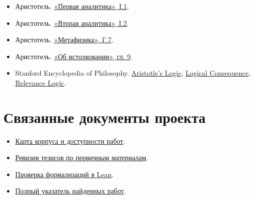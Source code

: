 \documentclass[12pt,a4paper]{article}
\begin{document}
\begin{itemize}
\item Аристотель. \href{https://classics.mit.edu/Aristotle/prior.1.i.html}{«Первая аналитика», I.1}.
\item Аристотель. \href{https://classics.mit.edu/Aristotle/posterior.1.i.html}{«Вторая аналитика», I.2}.
\item Аристотель. \href{https://aristotle.johnhboyer.com/Meta/book/4/}{«Метафизика», Γ.7}.
\item Аристотель. \href{https://www.st-andrews.ac.uk/~mnat/~ball0888/salamis/interpretatione.html}{«Об истолковании», гл. 9}.
\item Stanford Encyclopedia of Philosophy. \href{https://plato.stanford.edu/entries/aristotle-logic/}{Aristotle’s Logic}, \href{https://plato.stanford.edu/entries/logical-consequence/}{Logical Consequence}, \href{https://plato.stanford.edu/entries/logic-relevance/}{Relevance Logic}.
\end{itemize}
\section{Связанные документы проекта}

\begin{itemize}
\item \href{../research/Карта-работ-Брусенцова.tex}{Карта корпуса и доступности работ}.
\item \href{../research/Ревизия-корпуса-Брусенцова.tex}{Ревизия тезисов по первичным материалам}.
\item \href{../research/Проверка-идей-Брусенцова-в-Lean.tex}{Проверка формализаций в Lean}.
\item \href{../research/Полный-указатель-трудов-Брусенцова.md}{Полный указатель найденных работ}.
\end{itemize}
\end{document}

